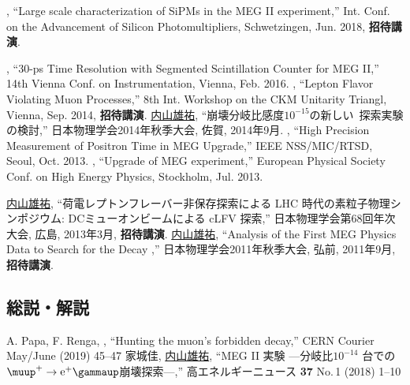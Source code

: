 \begin{enumerate}

 	 \me, ``Large scale characterization of SiPMs in the MEG II experiment,''
  	Int. Conf. on the Advancement of Silicon Photomultipliers, Schwetzingen, Jun. 2018, \textbf{招待講演}.

 	 \me, ``30-ps Time Resolution with Segmented Scintillation Counter for MEG II,''
  	14th Vienna Conf. on Instrumentation, Vienna, Feb. 2016.
 	 \me, ``Lepton Flavor Violating Muon Processes,''
  	8th Int. Workshop on the CKM Unitarity Triangl, Vienna, Sep. 2014, \textbf{招待講演}.
  	\underline{内山雄祐},  	``崩壊分岐比感度$10^{-15}$の新しい\megc\ 探索実験の検討,''
  	日本物理学会2014年秋季大会,  佐賀,  2014年9月.	
 	 \me, ``High Precision Measurement of Positron Time in MEG Upgrade,''
  	IEEE NSS/MIC/RTSD, Seoul, Oct. 2013.
 	 \me, ``Upgrade of MEG experiment,''
  	European Physical Society Conf. on High Energy Physics, Stockholm, Jul. 2013.


  	\underline{内山雄祐},  	``荷電レプトンフレーバー非保存探索による LHC 時代の素粒子物理シンポジウム: DCミューオンビームによる cLFV 探索,''
  	日本物理学会第68回年次大会,  広島,  2013年3月, \textbf{招待講演}.
  	\underline{内山雄祐},  	``Analysis of the First MEG Physics Data to Search for the Decay \megc,''
  	日本物理学会2011年秋季大会,  弘前,  2011年9月, \textbf{招待講演}.


\end{enumerate}

\subsection{総説・解説}
\begin{enumerate}
\setcounter{enumi}{59}
	\setlength{\itemsep}{-1pt}
  A. Papa, F. Renga, \me,
  ``Hunting the muon's forbidden decay,''
  CERN Courier May/June (2019) 45--47
  家城佳, \underline{内山雄祐},
  ``MEG II 実験 ---分岐比$10^{-14}$ 台での$\megc$崩壊探索---,''
  高エネルギーニュース {\bf 37} No.\,1 (2018) 1--10
\end{enumerate}

